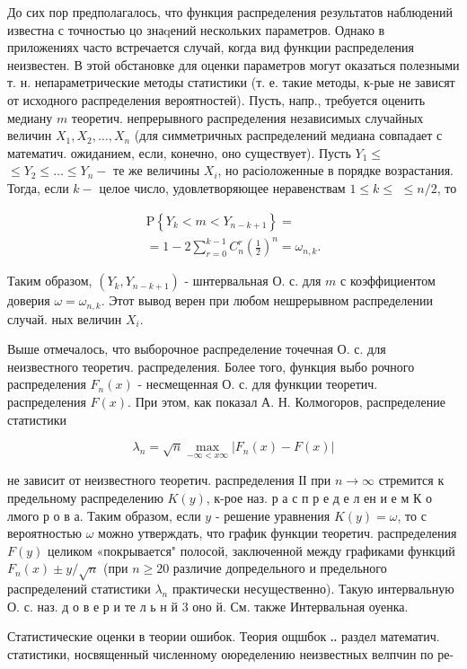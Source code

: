 \documentclass[10pt]{article}
\begin{document}
До сих пор предполагалось, что функция распределения результатов наблюдений известна с точностью цо знаqений нескольких параметров. Однако в приложениях часто встречается случай, когда вид функции распределения неизвестен. В этой обстановке для оценки параметров могут оказаться полезными т. н. непараметрические методы статистики (т. е. такие методы, к-рые не зависят от исходного распределения вероятностей). Пусть, напр., требуется оценить медиану $m$ теоретич. непрерывного распределения независимых случайных величин $X_{1}, X_{2}, \ldots, X_{n}$ (для симметричных распределений медиана совпадает с математич. ожиданием, если, конечно, оно существует). Пусть $Y_{1} \leqslant$ $\leqslant Y_{2} \leqslant \ldots \leqslant Y_{n}-$ те же величины $X_{i}$, но расіоложенные в порядке возрастания. Тогда, если $k-$ целое число, удовлетворяющее неравенствам $1 \leqslant k \leqslant$ $\leqslant n / 2$, то

\[
\begin{gathered}
\mathrm{P}\left\{Y_{k}<m<Y_{n-k+1}\right\}= \\
=1-2 \sum_{r=0}^{k-1} C_{n}^{r}\left(\frac{1}{2}\right)^{n}=\omega_{n, k} .
\end{gathered}
\]

Таким образом, $\left(Y_{k}, Y_{n-k+1}\right)$ - шнтервальная О. с. для $m$ с коэффициентом доверия $\omega=\omega_{n, k}$. Этот вывод верен при любом нешрерывном распределении случай. ных величин $X_{i}$.

Выше отмечалось, что выборочное распределение точечная О. с. для неизвестного теоретич. распределения. Более того, функция выбо рочного распределения $F_{n}(x)$ - несмещенная О. с. для функции теоретич. распределения $F(x)$. При этом, как показал А. Н. Колмогоров, распределение статистики

\[
\lambda_{n}=\sqrt{n} \max _{-\infty<x \infty}\left|F_{n}(x)-F(x)\right|
\]

не зависит от неизвестного теоретич. распределения ІІ при $n \rightarrow \infty$ стремится к предельному распределению $K(y)$, к-рое наз. р а с п р е д е л ен и е м К о лмого р о в а. Таким образом, если $y$ - решение уравнения $K(y)=\omega$, то с вероятностью $\omega$ можно утверждать, что график функции теоретич. распределения $F(y)$ целиком «покрывается" полосой, заключенной между графиками функций $F_{n}(x) \pm y / \sqrt{n}$ (при $n \geqslant 20$ различие допредельного и предельного распределений статистики $\lambda_{n}$ практически несущественно). Такую интервальную О. с. наз. д о в е р и те л ь н й 3 оно й. См. также Интервальная оуенка.

Статистические оценки в теории ошибок. Теория ощшбок ‥ раздел математич. статистики, носвященный численному оюределению неизвестных велпчин по ре-
\end{document}
